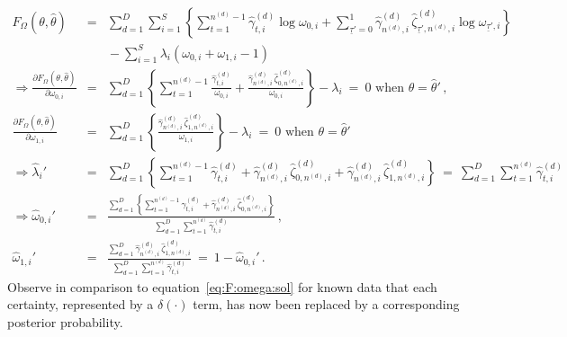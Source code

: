 \documentclass[a4paper]{article}
\begin{document}
\begin{eqnarray}
  F_{\Omega}(\theta,\hat{\theta}) & = & 
\sum_{d=1}^D\sum_{i=1}^{S}\left\{
\sum_{t=1}^{n^{(d)}-1}
\hat{\gamma}_{t,i}^{(d)}\log\omega_{0,i}+
\sum_{\underline{\tau}'=0}^{1}
\hat{\gamma}^{(d)}_{n^{(d)},i}\,\hat{\zeta}_{\underline{\tau}',n^{(d)},i}^{(d)}\log\omega_{\underline{\tau}',i}
\right\}
\nonumber\\&&
{}-\sum_{i=1}^{S}\lambda_i\left(\omega_{0,i}+\omega_{1,i}-1\right)
\\
\Rightarrow
  \frac{\partial F_{\Omega}(\theta,\hat{\theta})}{\partial\omega_{0,i}} & = &
\sum_{d=1}^D\left\{
\sum_{t=1}^{n^{(d)}-1}
\frac{\hat{\gamma}_{t,i}^{(d)}}{\omega_{0,i}}+
\frac{\hat{\gamma}^{(d)}_{n^{(d)},i}\,\hat{\zeta}_{0,n^{(d)},i}^{(d)}}{\omega_{0,i}}
\right\}-\lambda_i~=~0\mbox{ when }\theta=\hat{\theta}'\,,
\nonumber\\
  \frac{\partial F_{\Omega}(\theta,\hat{\theta})}{\partial\omega_{1,i}} & = &
\sum_{d=1}^D\left\{
\frac{\hat{\gamma}^{(d)}_{n^{(d)},i}\,\hat{\zeta}_{1,n^{(d)},i}^{(d)}}{\omega_{1,i}}
\right\}-\lambda_i~=~0\mbox{ when }\theta=\hat{\theta}'
\nonumber\\
\Rightarrow\hat{\lambda}_i' & = & \sum_{d=1}^D\left\{
\sum_{t=1}^{n^{(d)}-1}\hat{\gamma}_{t,i}^{(d)}+\hat{\gamma}^{(d)}_{n^{(d)},i}\,\hat{\zeta}_{0,n^{(d)},i}^{(d)}
+\hat{\gamma}^{(d)}_{n^{(d)},i}\,\hat{\zeta}_{1,n^{(d)},i}^{(d)}\right\}
~=~\sum_{d=1}^D\sum_{t=1}^{n^{(d)}}\hat{\gamma}_{t,i}^{(d)}
\nonumber\\
\Rightarrow \hat{\omega}_{0,i}' & = &
\frac{\sum_{d=1}^D\left\{
           \sum_{t=1}^{n^{(d)}-1}\hat{\gamma}_{t,i}^{(d)}+\hat{\gamma}^{(d)}_{n^{(d)},i}\,\hat{\zeta}_{0,n^{(d)},i}^{(d)}\right\}}
       {\sum_{d=1}^D\sum_{t=1}^{n^{(d)}}\hat{\gamma}_{t,i}^{(d)}}\,,
\nonumber\\
\hat{\omega}_{1,i}' & = & 
\frac{\sum_{d=1}^D\hat{\gamma}^{(d)}_{n^{(d)},i}\,\hat{\zeta}_{1,n^{(d)},i}^{(d)}}
       {\sum_{d=1}^D\sum_{t=1}^{n^{(d)}}\hat{\gamma}_{t,i}^{(d)}}~=~1-\hat{\omega}_{0,i}'\,.
\end{eqnarray}
Observe in comparison to equation~\eqref{eq:F:omega:sol} for known data that each certainty, represented by a $\delta(\cdot)$ term, has now been replaced
by a corresponding posterior probability.

\end{document}
